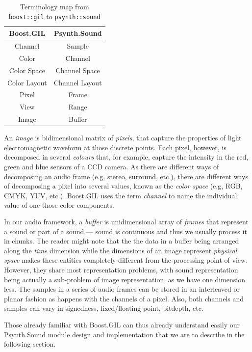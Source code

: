 \begin{table}[h]
  \centering
  \begin{tabular}{c|c}
    Boost.GIL & Psynth.Sound \\ \hline\hline
    Channel   & Sample \\
    Color     & Channel \\
    Color Space & Channel Space \\
    Color Layout & Channel Layout \\
    Pixel & Frame \\
    View & Range \\
    Image & Buffer
  \end{tabular}
  \caption{Terminology map from \texttt{boost::gil} to \texttt{psynth::sound}}
  \label{tab:gilmap}
\end{table}

An \emph{image} is bidimensional matrix of
\emph{pixels}, that capture the properties of light
electromagnetic waveform at those discrete points. Each pixel,
however, is decomposed in several \emph{colours} that,
for example, capture the intensity in the red, green and blue sensors
of a CCD camera. As there are different ways of decomposing an audio
frame (e.g, stereo, surround, etc.), there are different ways of
decomposing a pixel into several values, known as the \emph{color
  space} (e.g, RGB, CMYK, YUV, etc.). Boost.GIL uses the term
\emph{channel} to name the individual value of one those color
components.

In our audio framework, a \emph{buffer} is unidimensional array of
\emph{frames} that represent a sound or part of a sound --- sound is
continuous and thus we usually process it in chunks. The reader might
note that the the data in a buffer being arranged along the
\emph{time} dimension while the dimensions of an image represent
\emph{physical space} makes these entities completely different from
the processing point of view. However, they share most representation
problems, with sound representation being actually a sub-problem of
image representation, as we have one dimension less. The samples in a
series of audio frames can be stored in an interleaved or planar
fashion as happens with the channels of a pixel. Also, both channels
and samples can vary in signedness, fixed/floating point, bitdepth,
etc.

Those already familiar with Boost.GIL can thus already understand
easily our Psynth.Sound module design and implementation that we are
to describe in the following section.

